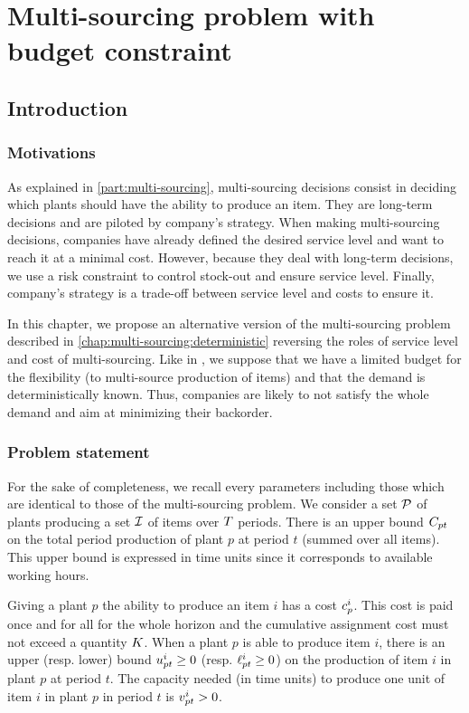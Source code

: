 \chapter{Multi-sourcing problem with budget constraint}


\section{Introduction}


\subsection{Motivations}


As explained in \cref{part:multi-sourcing}, multi-sourcing decisions consist in deciding which plants should have the ability to produce an item.
They are long-term decisions and are piloted by company's strategy.
When making multi-sourcing decisions, companies have already defined the desired service level and want to reach it at a minimal cost.
However, because they deal with long-term decisions, we use a risk constraint to control stock-out and ensure service level.
Finally, company's strategy is a trade-off between service level and costs to ensure it.


In this chapter, we propose an alternative version of the multi-sourcing problem described in \cref{chap:multi-sourcing:deterministic} reversing the roles of service level and cost of multi-sourcing.
Like in \citet{Fiorotto2018}, we suppose that we have a limited budget for the flexibility (\ie to multi-source production of items) and that the demand is deterministically known.
Thus, companies are likely to not satisfy the whole demand and aim at minimizing their backorder.


\subsection{Problem statement}


For the sake of completeness, we recall every parameters including those which are identical to those of the multi-sourcing problem.
We consider a set $\mathcal{P}$ of plants producing a set $\mathcal{I}$ of items over $T$ periods.
There is an upper bound $C_{pt}$ on the total period production of plant $p$ at period $t$ (summed over all items).
This upper bound is expressed in time units since it corresponds to available working hours.


Giving a plant $p$ the ability to produce an item $i$ has a cost $c_p^i$.
This cost is paid once and for all for the whole horizon and the cumulative assignment cost must not exceed a quantity $K$.
When a plant $p$ is able to produce item $i$, there is an upper (resp. lower) bound $u_{pt}^i\ge 0$ (resp. $\ell_{pt}^i\ge 0$) on the production of item $i$ in plant $p$ at period $t$.
The capacity needed (in time units) to produce one unit of item $i$ in plant $p$ in period $t$ is $v_{pt}^i>0$.


